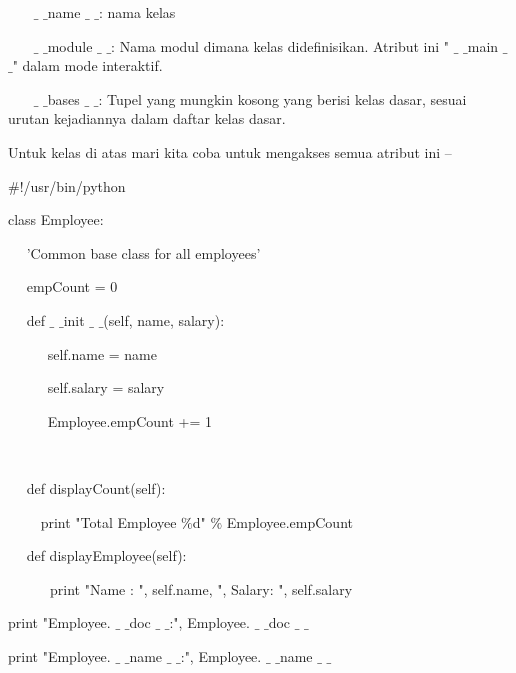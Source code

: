\begin {enumerate}
\noindent 
~~~  $  \_  $ $  \_  $name $  \_  $ $  \_  $: nama kelas \par
\vspace{12pt}
\noindent 
~~~  $  \_  $ $  \_  $module $  \_  $ $  \_  $: Nama modul dimana kelas didefinisikan. Atribut ini " $  \_  $ $  \_  $main $  \_  $ $  \_  $" dalam mode interaktif. \par
\vspace{12pt}
\noindent 
~~~  $  \_  $ $  \_  $bases $  \_  $ $  \_  $: Tupel yang mungkin kosong yang berisi kelas dasar, sesuai urutan kejadiannya dalam daftar kelas dasar. \par
\vspace{12pt}
\noindent 
Untuk kelas di atas mari kita coba untuk mengakses semua atribut ini – \par
\vspace{12pt}
\noindent 
 $  \#  $!/usr/bin/python \par
\vspace{12pt}
\noindent 
class Employee: \par
\noindent 
~~ 'Common base class for all employees' \par
\noindent 
~~ empCount = 0 \par
\vspace{12pt}
\noindent 
~~ def  $  \_  $ $  \_  $init $  \_  $ $  \_  $(self, name, salary): \par
\noindent 
~~~~~ self.name = name \par
\noindent 
~~~~~ self.salary = salary \par
\noindent 
~~~~~ Employee.empCount += 1 \par
\noindent 
~~  \par
\noindent 
~~ def displayCount(self): \par
\noindent 
~~~~ print "Total Employee  $  \%  $d"  $  \%  $ Employee.empCount \par
\vspace{12pt}
\noindent 
~~ def displayEmployee(self): \par
\noindent 
~~~~~~print "Name : ", self.name,  ", Salary: ", self.salary \par
\vspace{12pt}
\noindent 
print "Employee. $  \_  $ $  \_  $doc $  \_  $ $  \_  $:", Employee. $  \_  $ $  \_  $doc $  \_  $ $  \_  $ \par
\noindent 
print "Employee. $  \_  $ $  \_  $name $  \_  $ $  \_  $:", Employee. $  \_  $ $  \_  $name $  \_  $ $  \_  $ \par
\noindent 

\end{enumerate}
